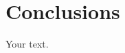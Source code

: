 \documentclass[../../main.tex]{subfiles} %
\begin{document}
\section{Conclusions}
Your text.
\end{document}
